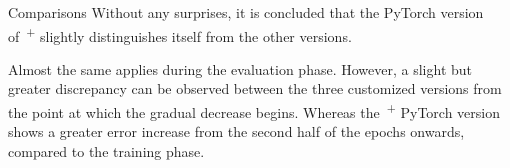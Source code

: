 \begin{section}{Comparisons}
    Without any surprises, it is concluded that the PyTorch version of~\textsuperscript{+} slightly distinguishes itself from the other versions.\\
    \par Almost the same applies during the evaluation phase. However, a slight but greater discrepancy can be observed between the three customized versions from the point at which the gradual decrease begins. Whereas the~\textsuperscript{+} PyTorch version shows a greater error increase from the second half of the epochs onwards, compared to the training phase.
\end{section}